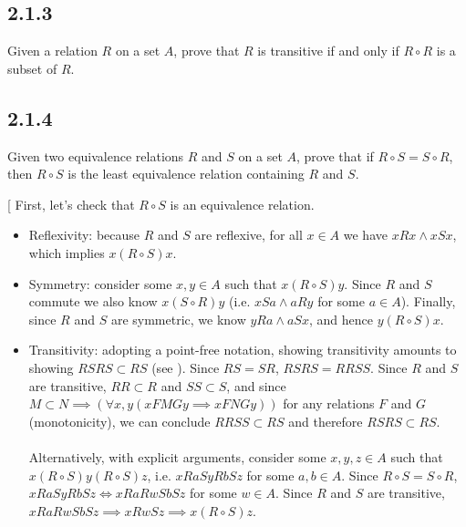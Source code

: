 \subsection{2.1.3} \label{subsec:2.1.3}

Given a relation $R$ on a set $A$, prove that $R$ is transitive if and only if $R \circ R$ is a subset of $R$.


\subsection{2.1.4}

Given two equivalence relations $R$ and $S$ on a set $A$, prove that if $R \circ S = S \circ R$, then $R \circ S$ is the least equivalence relation containing $R$ and $S$.

\solution[
    First, let's check that $R \circ S$ is an equivalence relation.
    \begin{itemize}
        \item Reflexivity: because $R$ and $S$ are reflexive, for all $x \in A$ we have $xRx \land xSx$, which implies $x(R \circ S)x$.
        \item Symmetry: consider some $x, y \in A$ such that $x(R \circ S)y$. Since $R$ and $S$ commute we also know $x(S \circ R)y$ (i.e. $xSa \land aRy$ for some $a \in A$). Finally, since $R$ and $S$ are symmetric, we know $yRa \land aSx$, and hence $y(R \circ S)x$.
        \item
              Transitivity: adopting a point-free notation, showing transitivity amounts to showing $RSRS \subset RS$ (see ). Since $RS = SR$, $RSRS = RRSS$. Since $R$ and $S$ are transitive, $RR \subset R$ and $SS \subset S$, and since $M \subset N \implies (\forall x,y (xFMGy \implies xFNGy))$ for any relations $F$ and $G$ (monotonicity), we can conclude $RRSS \subset RS$ and therefore $RSRS \subset RS$.
              \\\\
              Alternatively, with explicit arguments, consider some $x,y,z \in A$ such that $x(R \circ S)y(R \circ S)z$, i.e. $xRaSyRbSz$ for some $a,b \in A$. Since $R \circ S = S \circ R$, $xRaSyRbSz \iff xRaRwSbSz$ for some $w \in A$. Since $R$ and $S$ are transitive, $xRaRwSbSz \implies xRwSz \implies x(R \circ S)z$.
    \end{itemize}

